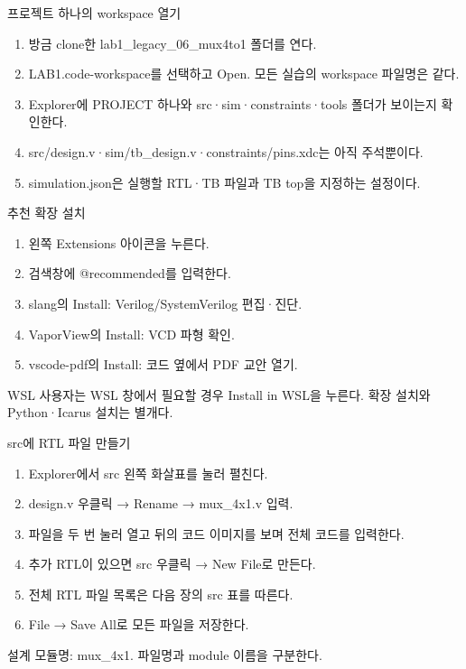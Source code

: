 \begin{frame}{프로젝트 하나의 workspace 열기}\relax
\small
\begin{enumerate}\setlength{\itemsep}{0.22cm}
\item 방금 clone한 lab1\_legacy\_06\_mux4to1 폴더를 연다.
\item LAB1.code-workspace를 선택하고 Open. 모든 실습의 workspace 파일명은 같다.
\item Explorer에 PROJECT 하나와 src·sim·constraints·tools 폴더가 보이는지 확인한다.
\item src/design.v·sim/tb\_design.v·constraints/pins.xdc는 아직 주석뿐이다.
\item simulation.json은 실행할 RTL·TB 파일과 TB top을 지정하는 설정이다.
\end{enumerate}

\end{frame}

\begin{frame}{추천 확장 설치}\relax
\small
\begin{enumerate}\setlength{\itemsep}{0.22cm}
\item 왼쪽 Extensions 아이콘을 누른다.
\item 검색창에 @recommended를 입력한다.
\item slang의 Install: Verilog/SystemVerilog 편집·진단.
\item VaporView의 Install: VCD 파형 확인.
\item vscode-pdf의 Install: 코드 옆에서 PDF 교안 열기.
\end{enumerate}
WSL 사용자는 WSL 창에서 필요할 경우 Install in WSL을 누른다. 확장 설치와 Python·Icarus 설치는 별개다.\par
\end{frame}

\begin{frame}{src에 RTL 파일 만들기}\relax
\small
\begin{enumerate}\setlength{\itemsep}{0.22cm}
\item Explorer에서 src 왼쪽 화살표를 눌러 펼친다.
\item design.v 우클릭 → Rename → mux\_4x1.v 입력.
\item 파일을 두 번 눌러 열고 뒤의 코드 이미지를 보며 전체 코드를 입력한다.
\item 추가 RTL이 있으면 src 우클릭 → New File로 만든다.
\item 전체 RTL 파일 목록은 다음 장의 src 표를 따른다.
\item File → Save All로 모든 파일을 저장한다.
\end{enumerate}
설계 모듈명: mux\_4x1. 파일명과 module 이름을 구분한다.\par
\end{frame}

